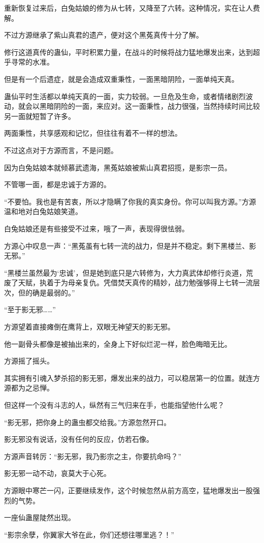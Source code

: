 \begin{this_body}
重新恢复过来后，白兔姑娘的修为从七转，又降至了六转。这种情况，实在让人费解。

不过方源继承了紫山真君的遗产，便对这个黑菟真传十分了解。

修行这道真传的蛊仙，平时积累力量，在战斗的时候将战力猛地爆发出来，达到超乎寻常的水准。

但是有一个后遗症，就是会造成双重秉性，一面黑暗阴险，一面单纯天真。

蛊仙平时生活都以单纯天真的一面，实力较弱。一旦危及生命，或者情绪剧烈波动，就会以黑暗阴险的一面，来应对。这一面秉性，战力很强，当然持续时间比较另一面就短暂了许多。

两面秉性，共享感观和记忆，但往往有着不一样的想法。

不过这点对于方源而言，不是问题。

因为白兔姑娘本就倾慕武遗海，黑菟姑娘被紫山真君招揽，是影宗一员。

不管哪一面，都是忠诚于方源的。

“不要怕。我也是有苦衷，所以才隐瞒了你我的真实身份。你可以叫我方源。”方源温和地对白兔姑娘笑道。

白兔姑娘还是有些接受不过来，哦了一声，表现得很怯弱。

方源心中叹息一声：“黑菟虽有七转一流的战力，但是并不稳定。剩下黑楼兰、影无邪。”

“黑楼兰虽然最为‘忠诚’，但是她到底只是六转修为，大力真武体却修行炎道，荒废了天赋，执着于为母亲复仇。凭借焚天真传的精妙，战力勉强够得上七转一流层次，但的确是最弱的。”

“至于影无邪……”

方源望着直接瘫倒在鹰背上，双眼无神望天的影无邪。

他一副骨头都像是被抽出来的，全身上下好似烂泥一样，脸色晦暗无比。

方源摇了摇头。

其实拥有引魂入梦杀招的影无邪，爆发出来的战力，可以稳居第一的位置。就连方源都为之忌惮。

但这样一个没有斗志的人，纵然有三气归来在手，也能指望他什么呢？

“影无邪，把你身上的蛊虫都交给我。”方源忽然开口。

影无邪没有说话，没有任何的反应，仿若石像。

方源声音转厉：“影无邪，我乃影宗之主，你要抗命吗？”

影无邪一动不动，哀莫大于心死。

方源眼中寒芒一闪，正要继续发作，这个时候忽然从前方高空，猛地爆发出一股强烈的气势。

一座仙蛊屋陡然出现。

“影宗余孽，你翼家大爷在此，你们还想往哪里逃？！”

\end{this_body}

